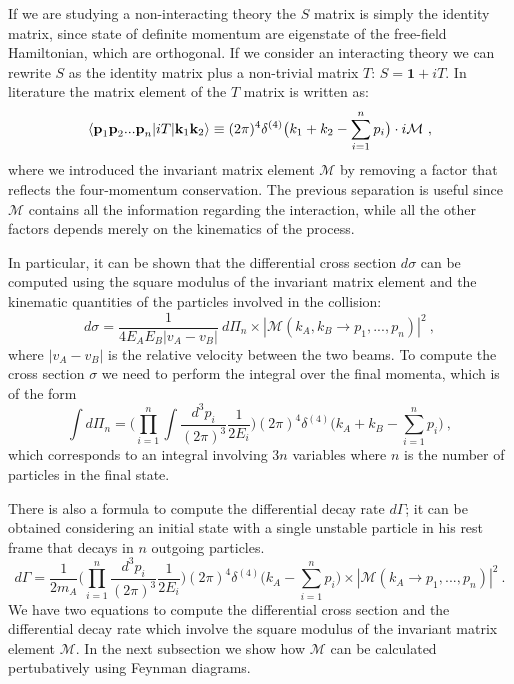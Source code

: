 \documentclass[../main/main.tex]{subfiles}
\begin{document}
If we are studying a non-interacting theory the $S$ matrix is simply the identity matrix, since state of
definite momentum are eigenstate of the free-field Hamiltonian, which are orthogonal. If we consider an interacting theory we can rewrite $S$ as the identity matrix plus a non-trivial matrix $T$: $S = \textbf{1}+ i T$.
\newline
In literature the matrix element of the $T$ matrix is written as:
\begin{equation}
	\label{first matrix element}
	\braket{\textbf{p}_1\textbf{p}_2 ... \textbf{p}_n |i T | \textbf{k}_1 \textbf{k}_2 } \equiv 
	(2 \pi)^4 \delta^{(4)}\big(k_1+k_2- \sum_{i=1}^n p_i\big) \cdot i \mathcal{M} \ ,
\end{equation}
where we introduced the invariant matrix element $\mathcal{M}$ by removing a factor that reflects the four-momentum conservation.
The previous separation is useful since $\mathcal{M}$ contains all the information regarding the interaction, while all the other factors depends merely on the kinematics of the process.

In particular, it can be shown that the differential cross section $d\sigma$ can be computed using the square modulus of the invariant 
matrix element and the kinematic quantities of the particles involved in the collision:
\begin{equation}
	\label{sigma}
	d \sigma = \frac{1}{4 E_A E_B |v_A - v_B|} \  d\Pi_n \times |\mathcal{M}(k_A, k_B \to p_1, ..., p_n)|^2  \ ,
\end{equation}
where $ |v_A - v_B|$ is the relative velocity between the two beams.  To compute the cross section $\sigma$ we need to perform the integral over the final momenta, which is of the form
\begin{equation}
	\int d\Pi_n  = \bigg( \prod_{i=1}^{n}\int
	\frac{d^3 p_i}{(2 \pi)^3}
	\frac{1}{2 E_i} \bigg) (2\pi)^4 \delta^{(4)}\big(k_A+ k_B- \sum_{i=1}^n p_i\big) \ ,
\end{equation} 
which corresponds to an integral involving $3n$ variables where $n$ is the number of particles in the final state.

There is also a formula to compute the differential decay rate $d\Gamma$; it can be obtained considering an initial state with a single
unstable particle in his rest frame that decays in $n$ outgoing particles.
\begin{equation}
	d\Gamma = \frac{1}{2 m_A} \bigg( \prod_{i=1}^{n}
	\frac{d^3 p_i}{(2 \pi)^3}
	\frac{1}{2 E_i} \bigg) (2\pi)^4 \delta^{(4)}\big(k_A- \sum_{i=1}^n p_i\big) \times |\mathcal{M}(k_A \to p_1, ..., p_n)|^2 \ .
\end{equation}
We have two equations to compute the differential cross section and the differential decay rate which involve the square modulus of 
the invariant matrix element $\mathcal{M}$. In the next subsection we show how $\mathcal{M}$ can be calculated pertubatively using Feynman diagrams.
\end{document}
